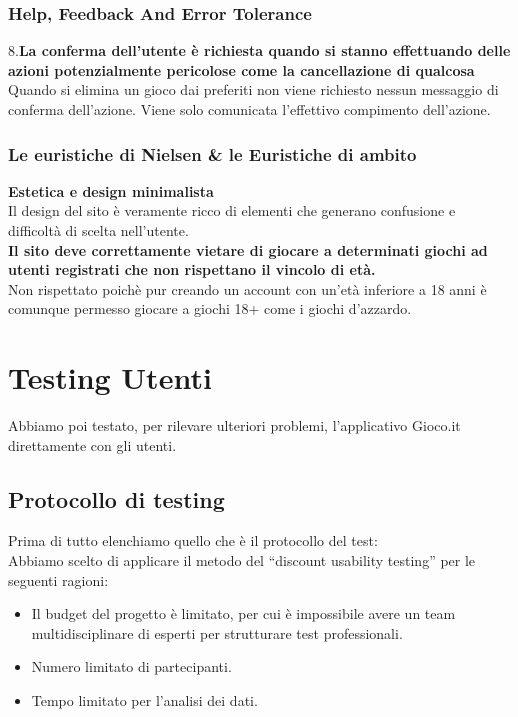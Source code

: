 \documentclass[../Report.tex]{subfiles}
\begin{document}
    \subsubsection{Help, Feedback And Error Tolerance}

    8.\textbf{La conferma dell’utente è richiesta quando si stanno effettuando delle azioni potenzialmente pericolose come la cancellazione di qualcosa \\
    }    
    Quando si elimina un gioco dai preferiti non viene richiesto nessun messaggio di conferma dell'azione. Viene solo comunicata l'effettivo compimento dell'azione.

    \subsubsection{Le euristiche di Nielsen \& le Euristiche di ambito}
        \textbf{Estetica e design minimalista}\\
        Il design del sito è veramente ricco di elementi che generano confusione e difficoltà di scelta nell’utente.\\ 
        \textbf{Il sito deve correttamente vietare di giocare a determinati giochi ad utenti  registrati che non rispettano il vincolo di età.}\\
        Non rispettato poichè pur creando un account con un’età inferiore a 18 anni è comunque permesso giocare a giochi 18+ come i giochi d’azzardo.

    \section{Testing Utenti}
    \label{section: initial_testing}
    Abbiamo poi testato, per rilevare ulteriori problemi, l’applicativo Gioco.it direttamente con gli utenti. 
    \subsection{Protocollo di testing }
    Prima di tutto elenchiamo quello che è il protocollo del test:\\
    Abbiamo scelto di applicare il metodo del “discount usability testing” per le seguenti ragioni:
    \begin{itemize}
        \item Il budget del progetto è limitato, per cui è impossibile avere un team multidisciplinare di esperti per strutturare test professionali. 
        \item Numero limitato di partecipanti. 
        \item Tempo limitato per l’analisi dei dati.
    \end{itemize}
\end{document}
